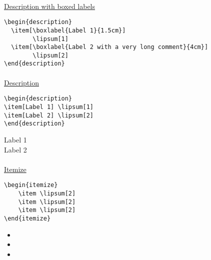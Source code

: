 \paragraph*{} \underline{Description with boxed labels}
\begin{verbatim}
\begin{description}
  \item[\boxlabel{Label 1}{1.5cm}]
        \lipsum[1]
  \item[\boxlabel{Label 2 with a very long comment}{4cm}]
        \lipsum[2]
\end{description}
\end{verbatim}

\begin{description}
  \item[]
        \lipsum[1]
  \item[]
         \lipsum[2]
\end{description}
\paragraph*{} \underline{Description}
\begin{verbatim}
\begin{description}
\item[Label 1] \lipsum[1]
\item[Label 2] \lipsum[2]
\end{description}
\end{verbatim}

\begin{description}
\item[Label 1] \lipsum[1]
\item[Label 2] \lipsum[2]
\end{description}
\paragraph*{} \underline{Itemize}
\begin{verbatim}
\begin{itemize}
    \item \lipsum[2]
    \item \lipsum[2]
    \item \lipsum[2]
\end{itemize}
\end{verbatim}

\begin{itemize}
    \item \lipsum[2]
    \item \lipsum[2]
    \item \lipsum[2]
\end{itemize}
